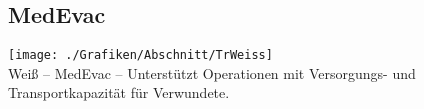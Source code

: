 \subsection{MedEvac}
\texttt{[image: ./Grafiken/Abschnitt/TrWeiss]}\\
Weiß -- \acf{MedEvac} -- Unterstützt Operationen mit Versorgungs- und Transportkapazität für Verwundete.